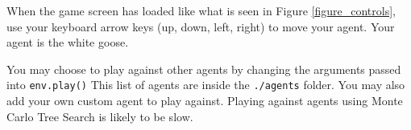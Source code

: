 


When the game screen has loaded like what is seen in Figure \ref{figure_controls}, use your keyboard arrow keys (up, down, left, right) to move your agent. Your agent is the white goose.

You may choose to play against other agents by changing the arguments passed into \verb|env.play()| This list of agents are inside the \verb|./agents| folder. You may also add your own custom agent to play against. Playing against agents using Monte Carlo Tree Search is likely to be slow.









